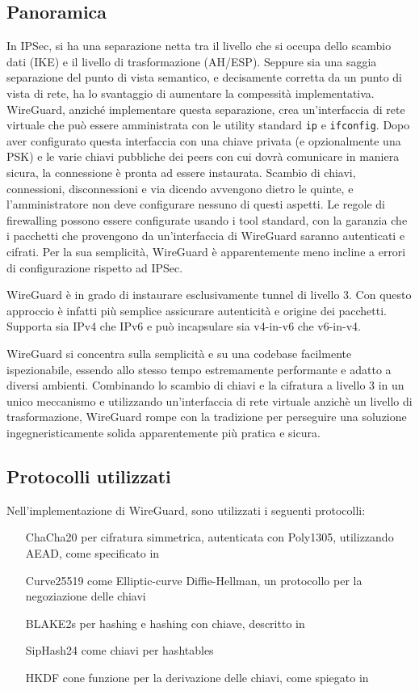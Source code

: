 \subsection{Panoramica}
In IPSec, si ha una separazione netta tra il livello che si occupa dello scambio dati (IKE) e il livello di trasformazione (AH/ESP). Seppure sia una saggia separazione del punto di vista semantico, e decisamente corretta da un punto di vista di rete, ha lo svantaggio di aumentare la compessità implementativa.
WireGuard, anziché implementare questa separazione, crea un'interfaccia di rete virtuale che può essere amministrata con le utility standard \texttt{ip} e \texttt{ifconfig}. Dopo aver configurato questa interfaccia con una chiave privata (e opzionalmente una PSK) e le varie chiavi pubbliche dei peers con cui dovrà comunicare in maniera sicura, la connessione è pronta ad essere instaurata. Scambio di chiavi, connessioni, disconnessioni e via dicendo avvengono dietro le quinte, e l'amministratore non deve configurare nessuno di questi aspetti.
Le regole di firewalling possono essere configurate usando i tool standard, con la garanzia che i pacchetti che provengono da un'interfaccia di WireGuard saranno autenticati e cifrati. Per la sua semplicità, WireGuard è apparentemente meno incline a errori di configurazione rispetto ad IPSec.

WireGuard è in grado di instaurare esclusivamente tunnel di livello 3. Con questo approccio è infatti più semplice assicurare autenticità e origine dei pacchetti. Supporta sia IPv4 che IPv6 e può incapsulare sia v4-in-v6 che v6-in-v4.

WireGuard si concentra sulla semplicità e su una codebase facilmente ispezionabile, essendo allo stesso tempo estremamente performante e adatto a diversi ambienti. Combinando lo scambio di chiavi e la cifratura a livello 3 in un unico meccanismo e utilizzando un'interfaccia di rete virtuale anzichè un livello di trasformazione, WireGuard rompe con la tradizione per perseguire una soluzione ingegneristicamente solida apparentemente più pratica e sicura.

\subsection{Protocolli utilizzati}
Nell'implementazione di WireGuard, sono utilizzati i seguenti protocolli:
\begin{itemize}
    \item[ChaCha20] per cifratura simmetrica, autenticata con Poly1305, utilizzando AEAD, come specificato in \cite[RFC7539]{RFC7539}
    \item[Curve25519] come Elliptic-curve Diffie-Hellman, un protocollo per la negoziazione delle chiavi
    \item[BLAKE2s] per hashing e hashing con chiave, descritto in \cite[RFC7693]{RFC7693}
    \item[SipHash24] come chiavi per hashtables
    \item[HKDF] cone funzione per la derivazione delle chiavi, come spiegato in \cite[RFC5869]{RFC5869}
\end{itemize}

